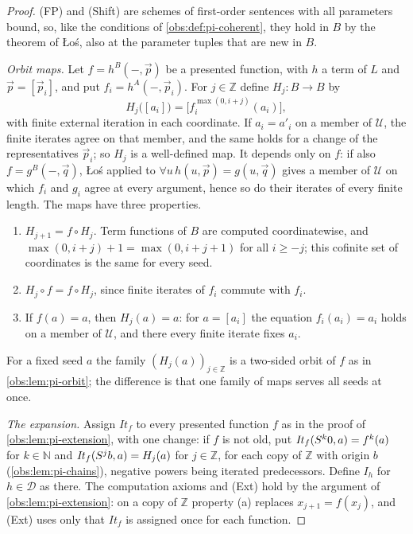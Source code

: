 \begin{proof}
(FP) and (Shift) are schemes of first-order sentences with all parameters
bound, so, like the conditions of \cref{obs:def:pi-coherent}, they hold in $B$
by the theorem of \L o\'s, also at the parameter tuples that are new in $B$.

\emph{Orbit maps.} Let $f=h^{B}(-,\vec p)$ be a presented function, with $h$ a
term of $L$ and $\vec p=[\vec p_i]$, and put $f_i=h^{A}(-,\vec p_i)$. For
$j\in\mathbb{Z}$ define $H_j\colon B\to B$ by
\[
H_j\bigl([a_i]\bigr)=\bigl[f_i^{\max(0,i+j)}(a_i)\bigr],
\]
with finite external iteration in each coordinate. If $a_i=a'_i$ on a member
of $\mathcal{U}$, the finite iterates agree on that member, and the same holds
for a change of the representatives $\vec p_i$; so $H_j$ is a well-defined map.
It depends only on $f$: if also $f=g^{B}(-,\vec q)$, \L o\'s applied to
$\forall u\,h(u,\vec p)=g(u,\vec q)$ gives a member of $\mathcal{U}$ on which
$f_i$ and $g_i$ agree at every argument, hence so do their iterates of every
finite length. The maps have three properties.
\begin{enumerate}[label=(\alph*)]
\item $H_{j+1}=f\circ H_j$. Term functions of $B$ are computed coordinatewise,
and $\max(0,i+j)+1=\max(0,i+j+1)$ for all $i\ge -j$; this cofinite set of
coordinates is the same for every seed.
\item $H_j\circ f=f\circ H_j$, since finite iterates of $f_i$ commute with
$f_i$.
\item If $f(a)=a$, then $H_j(a)=a$: for $a=[a_i]$ the equation $f_i(a_i)=a_i$
holds on a member of $\mathcal{U}$, and there every finite iterate fixes $a_i$.
\end{enumerate}
For a fixed seed $a$ the family $(H_j(a))_{j\in\mathbb{Z}}$ is a two-sided orbit
of $f$ as in \cref{obs:lem:pi-orbit}; the difference is that one family of maps
serves all seeds at once.

\emph{The expansion.} Assign $\mathit{It}_f$ to every presented function $f$ as
in the proof of \cref{obs:lem:pi-extension}, with one change: if $f$ is not
old, put $\mathit{It}_f(S^{k}0,a)=f^{k}(a)$ for $k\in\mathbb{N}$ and
$\mathit{It}_f(S^{j}b,a)=H_j(a)$ for $j\in\mathbb{Z}$, for each copy of
$\mathbb{Z}$ with origin $b$ (\cref{obs:lem:pi-chains}), negative powers being
iterated predecessors. Define $I_h$ for $h\in\mathcal{D}$ as there. The
computation axioms and (Ext) hold by the argument of
\cref{obs:lem:pi-extension}: on a copy of $\mathbb{Z}$ property (a) replaces
$x_{j+1}=f(x_j)$, and (Ext) uses only that $\mathit{It}_f$ is assigned once for
each function.


\end{proof}
